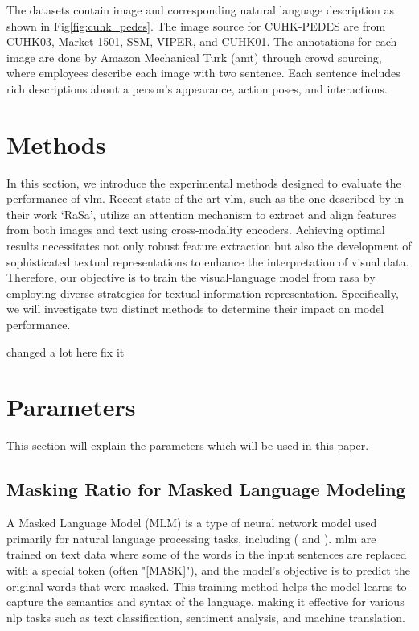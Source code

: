 The datasets contain image and corresponding natural language description as shown in Fig\ref{fig:cuhk_pedes}. The image source for CUHK-PEDES are from CUHK03, Market-1501, SSM, VIPER, and CUHK01. The annotations for each image are done by Amazon Mechanical Turk (\acrshort{amt}) through crowd sourcing, where employees describe each image with two sentence. Each sentence includes rich descriptions about a person's appearance, action poses, and interactions.

\section{Methods}
In this section, we introduce the experimental methods designed to evaluate the performance of \acrshort{vlm}. Recent state-of-the-art \acrshort{vlm}, such as the one described by \cite{Bai2023RaSaRA} in their work `RaSa', utilize an attention mechanism to extract and align features from both images and text using cross-modality encoders. Achieving optimal results necessitates not only robust feature extraction but also the development of sophisticated textual representations to enhance the interpretation of visual data. Therefore, our objective is to train the visual-language model from \acrshort{rasa} by employing diverse strategies for textual information representation. Specifically, we will investigate two distinct methods to determine their impact on model performance.


{\color{red} changed a lot here fix it}
\section{Parameters}
This section will explain the parameters which will be used in this paper.


\subsection{Masking Ratio for Masked Language Modeling} 
A Masked Language Model (MLM) is a type of neural network model used primarily for natural language processing tasks, including (\cite{devlin2018bert} and \cite{Bai2023RaSaRA}). \acrshort{mlm} are trained on text data where some of the words in the input sentences are replaced with a special token (often "[MASK]"), and the model's objective is to predict the original words that were masked. This training method helps the model learns to capture the semantics and syntax of the language, making it effective for various \acrshort{nlp} tasks such as text classification, sentiment analysis, and machine translation.

